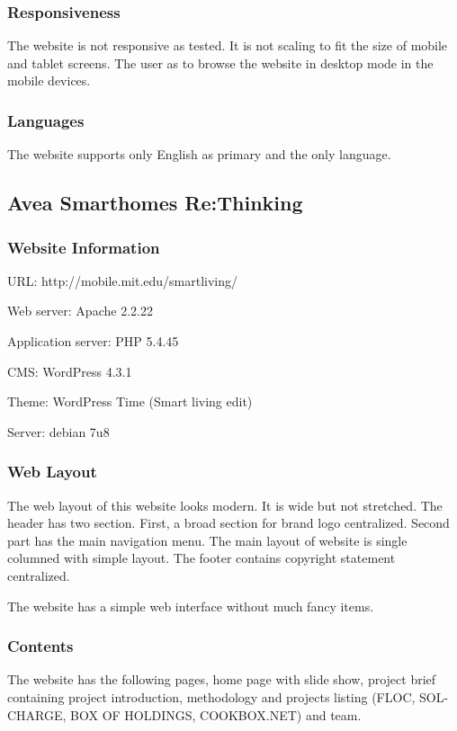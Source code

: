 \subsubsection*{Responsiveness}
The website is not responsive as tested. It is not scaling to fit the size of mobile and tablet screens. The user as to browse the website in desktop mode in the mobile devices.

\subsubsection*{Languages}
The website supports only English as primary and the only language.

\subsection{Avea Smarthomes Re:Thinking}
\subsubsection*{Website Information}
\begin{itemize*}
\item URL: http://mobile.mit.edu/smartliving/
\item Web server: Apache 2.2.22
\item Application server: PHP 5.4.45
\item CMS: WordPress 4.3.1
\item Theme: WordPress Time (Smart living edit)
\item Server: debian 7u8
\end{itemize*}

\subsubsection*{Web Layout}
The web layout of this website looks modern. It is wide but not stretched. The header has two section. First, a broad section for brand logo centralized. Second part has the main navigation menu. The main layout of website is single columned with simple layout. The footer contains copyright statement centralized.

The website has a simple web interface without much fancy items.

\subsubsection*{Contents}
The website has the following pages, home page with slide show, project brief containing project introduction, methodology and projects listing (FLOC, SOL-CHARGE, BOX OF HOLDINGS, COOKBOX.NET) and team.

